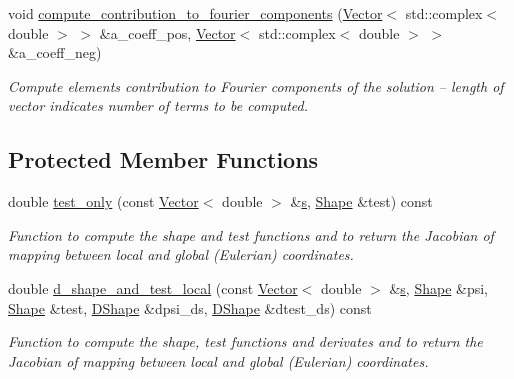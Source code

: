 \begin{DoxyCompactItemize}
void \hyperlink{classoomph_1_1HelmholtzBCElementBase_a893de4dec96142dfbc64ea78e88737ec}{compute\+\_\+contribution\+\_\+to\+\_\+fourier\+\_\+components} (\hyperlink{classoomph_1_1Vector}{Vector}$<$ std\+::complex$<$ double $>$ $>$ \&a\+\_\+coeff\+\_\+pos, \hyperlink{classoomph_1_1Vector}{Vector}$<$ std\+::complex$<$ double $>$ $>$ \&a\+\_\+coeff\+\_\+neg)
\begin{DoxyCompactList}\small\item\em Compute element\textquotesingle{}s contribution to Fourier components of the solution -- length of vector indicates number of terms to be computed. \end{DoxyCompactList}\end{DoxyCompactItemize}
\subsection*{Protected Member Functions}
\begin{DoxyCompactItemize}
\item 
double \hyperlink{classoomph_1_1HelmholtzBCElementBase_a0ab124ee22e66e97013264cad6cc0c07}{test\+\_\+only} (const \hyperlink{classoomph_1_1Vector}{Vector}$<$ double $>$ \&\hyperlink{cfortran_8h_ab7123126e4885ef647dd9c6e3807a21c}{s}, \hyperlink{classoomph_1_1Shape}{Shape} \&test) const
\begin{DoxyCompactList}\small\item\em Function to compute the shape and test functions and to return the Jacobian of mapping between local and global (Eulerian) coordinates. \end{DoxyCompactList}\item 
double \hyperlink{classoomph_1_1HelmholtzBCElementBase_ab3183e6c6d742852fc890742a4e06d3f}{d\+\_\+shape\+\_\+and\+\_\+test\+\_\+local} (const \hyperlink{classoomph_1_1Vector}{Vector}$<$ double $>$ \&\hyperlink{cfortran_8h_ab7123126e4885ef647dd9c6e3807a21c}{s}, \hyperlink{classoomph_1_1Shape}{Shape} \&psi, \hyperlink{classoomph_1_1Shape}{Shape} \&test, \hyperlink{classoomph_1_1DShape}{D\+Shape} \&dpsi\+\_\+ds, \hyperlink{classoomph_1_1DShape}{D\+Shape} \&dtest\+\_\+ds) const
\begin{DoxyCompactList}\small\item\em Function to compute the shape, test functions and derivates and to return the Jacobian of mapping between local and global (Eulerian) coordinates. \end{DoxyCompactList}\end{DoxyCompactItemize}
